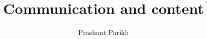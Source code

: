 \author{Prashant Parikh}
\title{Communication and content}
\subtitle{}
\renewcommand{\lsSeries}{tgdi}
\renewcommand{\lsSeriesNumber}{}
